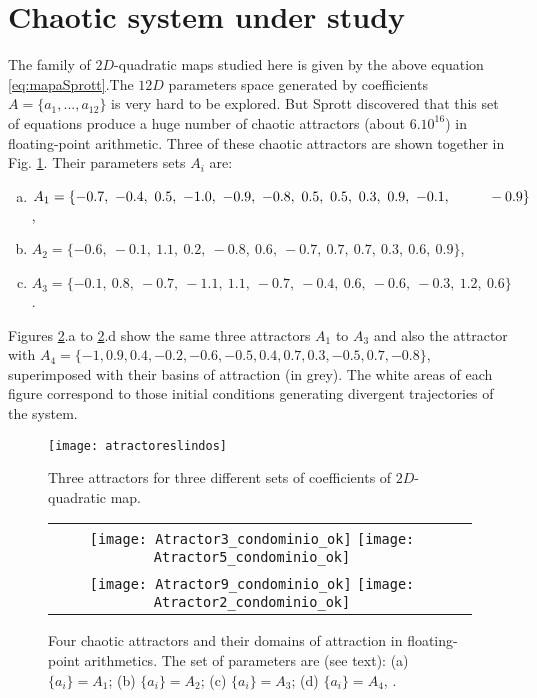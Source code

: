 \section{Chaotic system under study}
\label{sec:chaos}

The  family of $2D$-quadratic maps studied here is given by the
 above equation \ref{eq:mapaSprott}.The $12D$ parameters space generated by coefficients $A=\{a_1,...,a_{12}\}$  is very hard to be explored. But Sprott
discovered that this set of equations produce a huge number of
chaotic attractors (about $6 .  10^{16}$) in floating-point
arithmetic. Three of these chaotic attractors are shown together in Fig. \ref{fig:atractores}. Their parameters sets $A_i$ are:
%
\begin{enumerate}[a)]
\item  $A_1=\{-0.7,~-0.4,~0.5,~-1.0,~ -0.9,~ -0.8, ~0.5, ~0.5,~0.3,~0.9,~-0.1,\\
~~~~~~~  ~-0.9\}$,
\item $A_2=\{-0.6,~-0.1,~1.1,~0.2,~-0.8,~0.6,~-0.7,~0.7,~0.7,~0.3,~0.6,~0.9\}$, 
\item $A_3=\{ -0.1,~ 0.8,~ -0.7,~ -1.1,~1.1,~-0.7,~-0.4,~ 0.6,~ -0.6,~-0.3,~1.2,~0.6\}$.
\end{enumerate}
%

Figures \ref{fig:atractores3592}.a to \ref{fig:atractores3592}.d show the same three attractors $A_1$ to $A_3$  and also the attractor with $A_4=\{-1,0.9,0.4,-0.2,-0.6,-0.5,0.4,0.7,0.3,-0.5,0.7,-0.8\}$, superimposed with their basins of attraction (in grey).  The white areas of each figure correspond to 
those initial conditions generating divergent trajectories of the system.

\begin{figure}
    \centering
    \texttt{[image: atractoreslindos]}\\
    \caption{Three attractors for three different sets of  coefficients of $2D$-quadratic map.}\label{fig:atractores}
\end{figure}
%
\begin{figure}
\begin{tabular}{cc}
\texttt{[image: Atractor3\_condominio\_ok]}
\texttt{[image: Atractor5\_condominio\_ok]}\\
\texttt{[image: Atractor9\_condominio\_ok]}
\texttt{[image: Atractor2\_condominio\_ok]}
\end{tabular}
\caption{Four chaotic attractors and their domains of attraction in floating-point arithmetics. The set of parameters are (see text):
(a) $\{a_i\}=A_1$; (b)  $\{a_i\}=A_2$; (c)  $\{a_i\}=A_3$;  (d) $\{a_i\}=A_4$, \cite{Sprott1993}.}
\label{fig:atractores3592}
\end{figure}